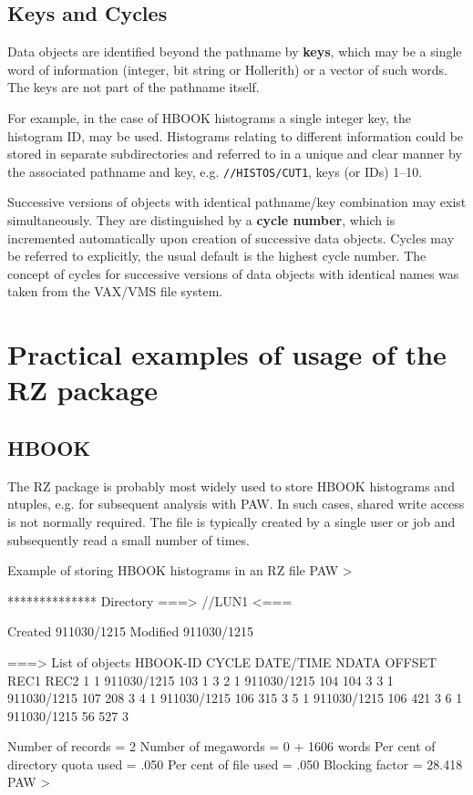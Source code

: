 \subsection{Keys and Cycles}

Data objects are identified beyond the pathname by {\bf keys},
which may be a single word of information
(integer, bit string or Hollerith)
or a vector of such words. The keys are not part of the pathname itself.

For example, in the case of HBOOK histograms a single integer
key, the histogram ID, may be used. Histograms relating to different
information could be stored in separate subdirectories and referred
to in a unique and clear manner by the associated pathname and
key, e.g. {\tt//HISTOS/CUT1}, keys (or IDs) 1--10.

Successive versions of objects with identical
pathname/key combination may exist simultaneously.
They are distinguished by a {\bf cycle number},
which is incremented automatically upon creation of successive data
objects. Cycles may be referred to explicitly,
the usual default is the highest cycle number.
The concept of cycles for successive versions of data objects with
identical names was taken from the VAX/VMS file system.

\newpage
{}
\section{Practical examples of usage of the RZ package}
\subsection{HBOOK}

The RZ package is probably most widely used to store HBOOK 
histograms and ntuples, e.g. for subsequent analysis
with PAW. 
In such cases, shared write access is not normally
required. The file is typically created by a single user
or job and subsequently read a small number of times.

\begin{XMPt}{Example of storing HBOOK histograms in an RZ file}
PAW > 

 ************** Directory ===> //LUN1 <===

                  Created 911030/1215  Modified 911030/1215

 ===> List of objects 
     HBOOK-ID  CYCLE   DATE/TIME   NDATA   OFFSET    REC1    REC2     
          1       1   911030/1215    103       1       3    
          2       1   911030/1215    104     104       3    
          3       1   911030/1215    107     208       3    
          4       1   911030/1215    106     315       3    
          5       1   911030/1215    106     421       3    
          6       1   911030/1215     56     527       3    

  Number of records =    2  Number of megawords =  0 +  1606 words
  Per cent of directory quota used =    .050
  Per cent of file used            =    .050
  Blocking factor                  =  28.418
 PAW >
\end{XMPt}

